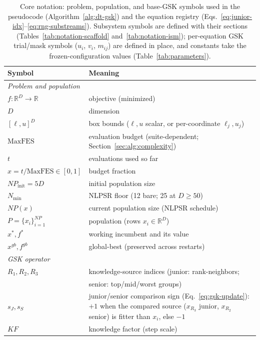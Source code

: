 \begin{table}[t]
\caption{Core notation: problem, population, and base-GSK symbols used in the
pseudocode (Algorithm~\ref{alg:dt-gsk}) and the equation registry
(Eqs.~\ref{eq:junior-idx}--\ref{eq:rng-substreams}). Subsystem symbols are
defined with their sections (Tables~\ref{tab:notation-scaffold}
and~\ref{tab:notation-ism}); per-equation GSK trial/mask symbols ($u_i$, $v_i$,
$m_{ij}$) are defined in place, and constants take the frozen-configuration
values (Table~\ref{tab:parameters}).}
\label{tab:notation}
\centering
\footnotesize
\begin{tabular}{@{}l@{\hspace{1.2em}}p{}@{}}
\toprule
\textbf{Symbol} & \textbf{Meaning}\\
\midrule
\multicolumn{2}{l}{\emph{Problem and population}}\\
\midrule
$f:\mathbb{R}^D\to\mathbb{R}$ & objective (minimized)\\
$D$ & dimension\\
$[\ell,u]^D$ & box bounds ($\ell,u$ scalar, or per-coordinate $\ell_j,u_j$)\\
$\text{MaxFES}$ & evaluation budget (suite-dependent; Section~\ref{sec:alg:complexity})\\
$t$ & evaluations used so far\\
$x = t/\text{MaxFES}\in[0,1]$ & budget fraction\\
$NP_{\text{init}} = 5D$ & initial population size\\
$N_{\min}$ & NLPSR floor (12 bare; 25 at $D\ge50$)\\
$NP(x)$ & current population size (NLPSR schedule)\\
$P=\{x_i\}_{i=1}^{NP}$ & population (rows $x_i\in\mathbb{R}^D$)\\
$x^{*}, f^{*}$ & working incumbent and its value\\
$x^{gb}, f^{gb}$ & global-best (preserved across restarts)\\
\midrule
\multicolumn{2}{l}{\emph{GSK operator}}\\
\midrule
$R_1,R_2,R_3$ & knowledge-source indices (junior: rank-neighbors;\\
              & \quad senior: top/mid/worst groups)\\
$s_J,s_S$ & junior/senior comparison sign (Eq.~\ref{eq:gsk-update}): $+1$ when
the compared source ($x_{R_3}$ junior, $x_{R_2}$ senior) is fitter than $x_i$,
else $-1$\\
$KF$ & knowledge factor (step scale)\\

\end{tabular}
\end{table}
